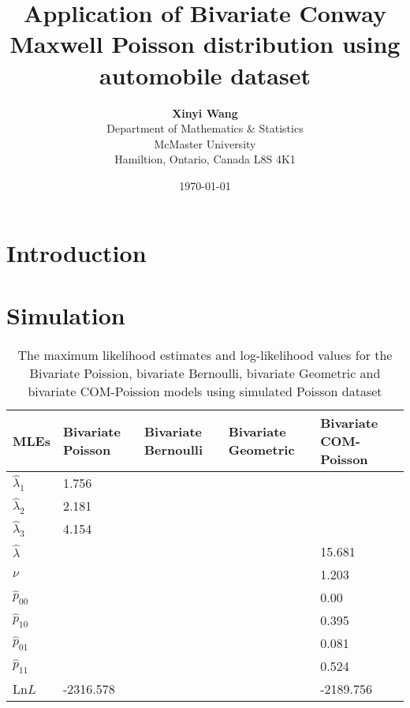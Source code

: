 \documentclass[12pt]{article}
\begin{document}
		\title{\bf Application of Bivariate Conway Maxwell Poisson distribution using automobile dataset }
\author{{\bf Xinyi Wang}\\Department of Mathematics \& Statistics \\McMaster University\\Hamiltion, Ontario, Canada L8S 4K1\\}
\date{\today}
\maketitle
\vspace{5cm}



\newpage
\section{Introduction}



\section{Simulation}
\begin{table}[H]
	\begin{center}
		\caption[\textbf{1}]
		{The maximum likelihood estimates and log-likelihood values for the Bivariate Poission, bivariate Bernoulli, bivariate Geometric and bivariate COM-Poission models using simulated Poisson dataset }
		\small
		\vspace{-1em}
		\begin{tabular}{lllll}
			\hline	\hline
			\textbf{MLEs} &\textbf{Bivariate Poisson}  & \textbf{Bivariate Bernoulli}&\textbf{Bivariate Geometric}& \textbf{Bivariate COM-Poisson}   \\
			\hline
			$\hat{\lambda}_1$&	1.756  & && \\
			$\hat{\lambda}_2$ & 2.181 & && \\
			$\hat{\lambda}_3$  & 4.154   & &&	 \\
			$\hat{\lambda}$  &  &   &&15.681\\
			$\nu$ &  &  &&1.203\\
			$\hat{p}_{00}$  &  & &&0.00\\
			$\hat{p}_{10}$ &&&&0.395\\
			$\hat{p}_{01}$ &&&&0.081\\
			$\hat{p}_{11}$ &&&&0.524\\
			Ln$L$ &-2316.578&&&-2189.756\\
			\hline
		\end{tabular}
	\end{center}
\end{table}
\end{document}
